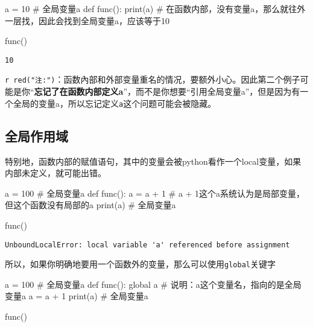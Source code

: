 \documentclass[
  letterpaper,
  DIV=11,
  numbers=noendperiod]{scrreprt}
\newenvironment{Shaded}{\begin{snugshade}}{\end{snugshade}}
\newcommand{\BuiltInTok}[1]{\textcolor[rgb]{0.00,0.23,0.31}{#1}}
\newcommand{\CommentTok}[1]{\textcolor[rgb]{0.37,0.37,0.37}{#1}}
\newcommand{\DecValTok}[1]{\textcolor[rgb]{0.68,0.00,0.00}{#1}}
\newcommand{\KeywordTok}[1]{\textcolor[rgb]{0.00,0.23,0.31}{#1}}
\newcommand{\NormalTok}[1]{\textcolor[rgb]{0.00,0.23,0.31}{#1}}
\newcommand{\OperatorTok}[1]{\textcolor[rgb]{0.37,0.37,0.37}{#1}}
\begin{document}
\begin{Shaded}
\begin{Highlighting}[]
\NormalTok{a }\OperatorTok{=} \DecValTok{10}      \CommentTok{\# 全局变量a}
\KeywordTok{def}\NormalTok{ func():}
    \BuiltInTok{print}\NormalTok{(a)  }\CommentTok{\# 在函数内部，没有变量a，那么就往外一层找，因此会找到全局变量\textasciigrave{}a\textasciigrave{}，应该等于10}
    
\NormalTok{func()}
\end{Highlighting}
\end{Shaded}

\begin{verbatim}
10
\end{verbatim}

\texttt{r\ red("注:")}：函数內部和外部变量重名的情况，要额外小心。因此第二个例子可能是你``\textbf{忘记了在函数内部定义a}''，而不是你想要``引用全局变量a''，但是因为有一个全局的变量a，所以忘记定义\texttt{a}这个问题可能会被隐藏。

\hypertarget{ux5168ux5c40ux4f5cux7528ux57df}{%
\subsection{全局作用域}\label{ux5168ux5c40ux4f5cux7528ux57df}}

特别地，函数内部的赋值语句，其中的变量会被python看作一个local变量，如果内部未定义，就可能出错。

\begin{Shaded}
\begin{Highlighting}[]
\NormalTok{a }\OperatorTok{=} \DecValTok{100}      \CommentTok{\# 全局变量a}
\KeywordTok{def}\NormalTok{ func():}
\NormalTok{    a }\OperatorTok{=}\NormalTok{ a }\OperatorTok{+} \DecValTok{1}  \CommentTok{\# a + 1这个a系统认为是局部变量，但这个函数没有局部的a}
    \BuiltInTok{print}\NormalTok{(a)   }\CommentTok{\# 全局变量a}
      
\NormalTok{func()}
\end{Highlighting}
\end{Shaded}

\begin{verbatim}
UnboundLocalError: local variable 'a' referenced before assignment
\end{verbatim}

所以，如果你明确地要用一个函数外的变量，那么可以使用\texttt{global}关键字

\begin{Shaded}
\begin{Highlighting}[]
\NormalTok{a }\OperatorTok{=} \DecValTok{100}      \CommentTok{\# 全局变量a}
\KeywordTok{def}\NormalTok{ func():}
    \KeywordTok{global}\NormalTok{ a }\CommentTok{\# 说明：a这个变量名，指向的是全局变量a}
\NormalTok{    a }\OperatorTok{=}\NormalTok{ a }\OperatorTok{+} \DecValTok{1}  
    \BuiltInTok{print}\NormalTok{(a)   }\CommentTok{\# 全局变量a}
      
\NormalTok{func()}
\end{Highlighting}
\end{Shaded}
\end{document}
